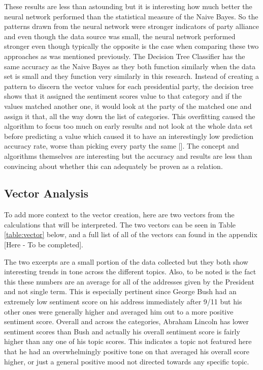 These results are less than astounding but it is interesting how much better the neural network performed than the statistical measure of the Naive Bayes.
So the patterns drawn from the neural network were stronger indicators of party alliance and even though the data source was small, the neural network performed stronger even though typically the opposite is the case when comparing these two approaches as was mentioned previously.
The Decision Tree Classifier has the same accuracy as the Naive Bayes as they both function similarly when the data set is small and they function very similarly in this research.
Instead of creating a pattern to discern the vector values for each presidential party, the decision tree shows that it assigned the sentiment scores value to that category and if the values matched another one, it would look at the party of the matched one and assign it that, all the way down the list of categories.
This overfitting caused the algorithm to focus too much on early results and not look at the whole data set before predicting a value which caused it to have an interestingly low prediction accuracy rate, worse than picking every party the same [\cite{dietterich1995overfitting}].
The concept and algorithms themselves are interesting but the accuracy and results are less than convincing about whether this can adequately be proven as a relation.

\subsection{Vector Analysis}
To add more context to the vector creation, here are two vectors from the calculations that will be interpreted.
The two vectors can be seen in Table \ref{table:vector} below, and a full list of all of the vectors can found in the appendix [Here - To be completed].

The two excerpts are a small portion of the data collected but they both show interesting trends in tone across the different topics.
Also, to be noted is the fact this these numbers are an average for all of the addresses given by the President and not single term.
This is especially pertinent since George Bush had an extremely low sentiment score on his address immediately after 9/11 but his other ones were generally higher and averaged him out to a more positive sentiment score.
Overall and across the categories, Abraham Lincoln has lower sentiment scores than Bush and actually his overall sentiment score is fairly higher than any one of his topic scores.
This indicates a topic not featured here that he had an overwhelmingly positive tone on that averaged his overall score higher, or just a general positive mood not directed towards any specific topic.

